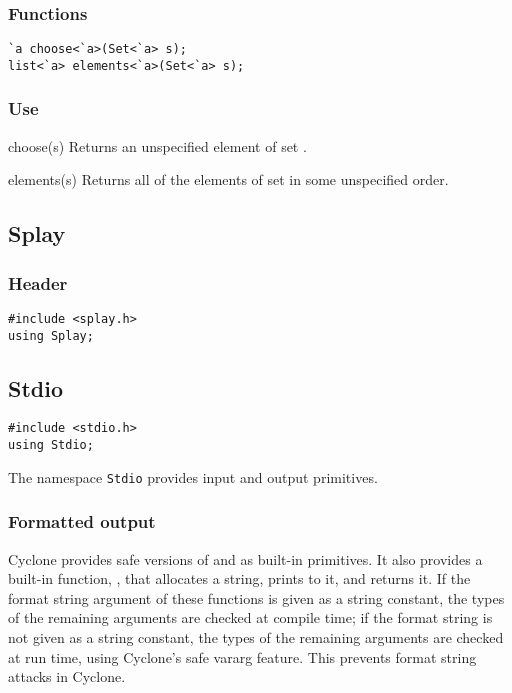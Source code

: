 \subsubsection*{Functions}
\begin{verbatim}
`a choose<`a>(Set<`a> s);
list<`a> elements<`a>(Set<`a> s);
\end{verbatim}

\subsubsection*{Use}

\begin{defun}{choose}{(s)}
Returns an unspecified element of set .
\end{defun}

\begin{defun}{elements}{(s)}
Returns all of the elements of set  in some unspecified order.
\end{defun}

\subsection{Splay}

\subsubsection*{Header}
\begin{verbatim}
#include <splay.h>
using Splay;
\end{verbatim}

\subsection{Stdio}

\begin{verbatim}
#include <stdio.h>
using Stdio;
\end{verbatim}

The namespace \texttt{Stdio} provides input and output primitives.


\subsubsection*{Formatted output}

Cyclone provides safe versions of  and  as
built-in primitives.  It also provides a built-in function,
, that allocates a string, prints to it, and returns it.
If the format string argument of these functions is given as a string
constant, the types of the remaining arguments are checked at compile
time; if the format string is not given as a string constant, the
types of the remaining arguments are checked at run time, using
Cyclone's safe vararg feature.  This prevents format string attacks in
Cyclone.

